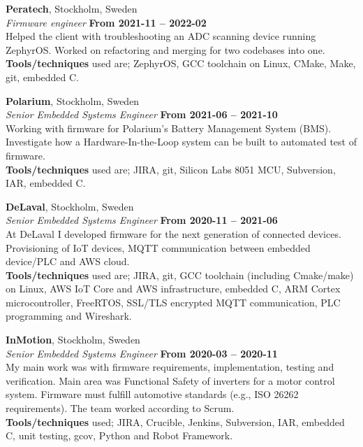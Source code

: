 \documentclass[a4paper,margin,line]{res} \usepackage{latexsym}
\begin{document}
\begin{resume}
\vspace{10mm}
{\bf Peratech}, Stockholm, Sweden\\
{\em Firmware engineer} \hfill {\bf From 2021-11 -- 2022-02}\\
Helped the client with troubleshooting an ADC scanning device running
ZephyrOS. Worked on refactoring and merging for two codebases into one.\\ 
{\bf Tools/techniques} used are; ZephyrOS, GCC toolchain on
Linux, CMake, Make, git, embedded C.


{\bf Polarium}, Stockholm, Sweden\\
{\em Senior Embedded Systems Engineer} \hfill {\bf From 2021-06 -- 2021-10}\\
Working with firmware for Polarium's Battery Management System (BMS).
Investigate how a Hardware-In-the-Loop system can be built to automated
test of firmware. \\ {\bf Tools/techniques} used are; JIRA, git, Silicon Labs 8051
MCU, Subversion, IAR, embedded C.


{\bf DeLaval}, Stockholm, Sweden\\
{\em Senior Embedded Systems Engineer} \hfill {\bf From 2020-11 --
  2021-06}\\ At DeLaval I developed firmware for the next
generation of connected devices. Provisioning of IoT devices, MQTT
communication between embedded device/PLC and AWS
cloud. \\ {\bf Tools/techniques} used are; JIRA, git, GCC toolchain
(including Cmake/make) on Linux, AWS IoT Core and AWS infrastructure,
embedded C, ARM Cortex microcontroller, FreeRTOS, SSL/TLS encrypted
MQTT communication, PLC programming and Wireshark.


{\bf InMotion}, Stockholm, Sweden\\
{\em Senior Embedded Systems Engineer} \hfill {\bf From 2020-03 --
  2020-11}\\ My main work was with firmware requirements,
implementation, testing and verification. Main area was Functional
Safety of inverters for a motor control system. Firmware must fulfill
automotive standards (e.g., ISO 26262 requirements). The team worked
according to Scrum. \\ {\bf Tools/techniques} used; JIRA, Crucible, Jenkins,
Subversion, IAR, embedded C, unit testing, gcov, Python and Robot
Framework.


\end{resume}
\end{document}
